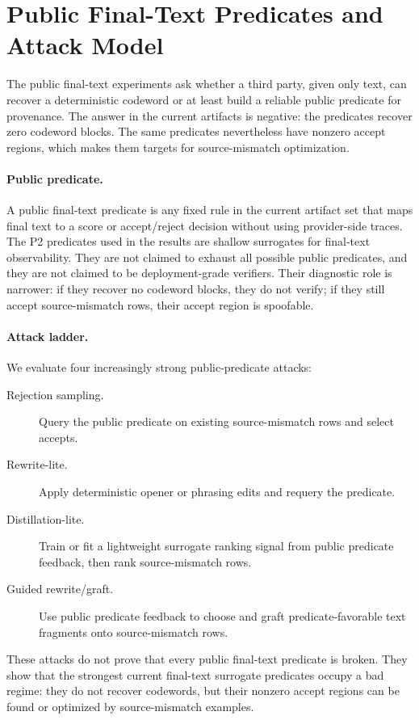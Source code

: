 \section{Public Final-Text Predicates and Attack Model}
\label{sec:verification}

The public final-text experiments ask whether a third party, given only text,
can recover a deterministic codeword or at least build a reliable public
predicate for provenance.  The answer in the current artifacts is negative:
the predicates recover zero codeword blocks.  The same predicates nevertheless
have nonzero accept regions, which makes them targets for source-mismatch
optimization.

\paragraph{Public predicate.}
A public final-text predicate is any fixed rule in the current artifact set
that maps final text to a score or accept/reject decision without using
provider-side traces.  The P2 predicates used in the results are shallow
surrogates for final-text observability.  They are not claimed to exhaust all
possible public predicates, and they are not claimed to be deployment-grade
verifiers.  Their diagnostic role is narrower: if they recover no codeword
blocks, they do not verify; if they still accept source-mismatch rows, their
accept region is spoofable.

\paragraph{Attack ladder.}
We evaluate four increasingly strong public-predicate attacks:
\begin{description}
\item[Rejection sampling.] Query the public predicate on existing
source-mismatch rows and select accepts.
\item[Rewrite-lite.] Apply deterministic opener or phrasing edits and requery
the predicate.
\item[Distillation-lite.] Train or fit a lightweight surrogate ranking signal
from public predicate feedback, then rank source-mismatch rows.
\item[Guided rewrite/graft.] Use public predicate feedback to choose and graft
predicate-favorable text fragments onto source-mismatch rows.
\end{description}

These attacks do not prove that every public final-text predicate is broken.
They show that the strongest current final-text surrogate predicates occupy a
bad regime: they do not recover codewords, but their nonzero accept regions can
be found or optimized by source-mismatch examples.

